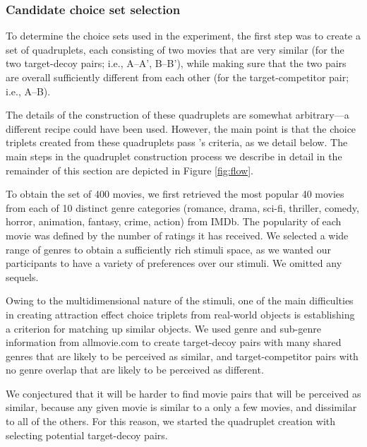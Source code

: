 \documentclass[12pt, a4paper]{article}
\begin{document}
\subsubsection*{Candidate choice set selection}

To determine the choice sets used in the experiment, the first step was to create a set of quadruplets, each consisting of two movies that are very similar (for the two target-decoy pairs; i.e., A--A', B--B'), while making sure that the two pairs are overall sufficiently different from each other (for the target-competitor pair; i.e., A--B).

The details of the construction of these quadruplets are somewhat arbitrary---a different recipe could have been used. However, the main point is that the choice triplets created from these quadruplets pass \citeauthor{Huber2014}'s \citeyear{Huber2014} criteria, as we detail below. The main steps in the quadruplet construction process we describe in detail in the remainder of this section are depicted in Figure \ref{fig:flow}.


To obtain the set of 400 movies, we first retrieved the most popular 40 movies from each of 10 distinct genre categories (romance, drama, sci-fi, thriller, comedy, horror, animation, fantasy, crime, action) from IMDb. The popularity of each movie was defined by the number of ratings it has received. We selected a wide range of genres to obtain a sufficiently rich stimuli space, as we wanted our participants to have a variety of preferences over our stimuli. We omitted any sequels.

Owing to the multidimensional nature of the stimuli, one of the main difficulties in creating attraction effect choice triplets from real-world objects is establishing a criterion for matching up similar objects. We used genre and sub-genre information from allmovie.com to create target-decoy pairs with many shared genres that are likely to be perceived as similar, and target-competitor pairs with no genre overlap that are likely to be perceived as different.

We conjectured that it will be harder to find movie pairs that will be perceived as similar, because any given movie is similar to a only a few movies, and dissimilar to all of the others. For this reason, we started the quadruplet creation with selecting potential target-decoy pairs.
\end{document}
